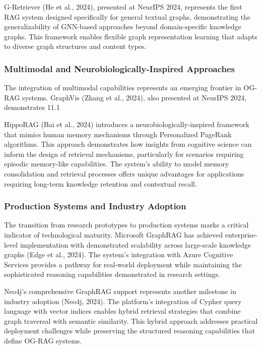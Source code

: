 \documentclass[12pt]{report}
\begin{document}
G-Retriever (He et al., 2024), presented at NeurIPS 2024, represents the first RAG system designed specifically for general textual graphs, demonstrating the generalizability of GNN-based approaches beyond domain-specific knowledge graphs. This framework enables flexible graph representation learning that adapts to diverse graph structures and content types.

\subsubsection{Multimodal and Neurobiologically-Inspired Approaches}

The integration of multimodal capabilities represents an emerging frontier in OG-RAG systems. GraphVis (Zhang et al., 2024), also presented at NeurIPS 2024, demonstrates 11.1%

HippoRAG (Bai et al., 2024) introduces a neurobiologically-inspired framework that mimics human memory mechanisms through Personalized PageRank algorithms. This approach demonstrates how insights from cognitive science can inform the design of retrieval mechanisms, particularly for scenarios requiring episodic memory-like capabilities. The system's ability to model memory consolidation and retrieval processes offers unique advantages for applications requiring long-term knowledge retention and contextual recall.

\subsubsection{Production Systems and Industry Adoption}

The transition from research prototypes to production systems marks a critical indicator of technological maturity. Microsoft GraphRAG has achieved enterprise-level implementation with demonstrated scalability across large-scale knowledge graphs (Edge et al., 2024). The system's integration with Azure Cognitive Services provides a pathway for real-world deployment while maintaining the sophisticated reasoning capabilities demonstrated in research settings.

Neo4j's comprehensive GraphRAG support represents another milestone in industry adoption (Neo4j, 2024). The platform's integration of Cypher query language with vector indices enables hybrid retrieval strategies that combine graph traversal with semantic similarity. This hybrid approach addresses practical deployment challenges while preserving the structured reasoning capabilities that define OG-RAG systems.
\end{document}
